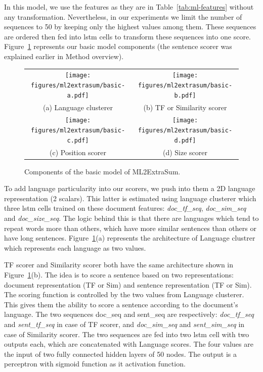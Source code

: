 In this model, we use the features as they are in Table~\ref{tab:ml-features} without any transformation. 
Nevertheless, in our experiments we limit the number of sequences to 50 by keeping only the highest values among them. 
These sequences are ordered then fed into \ac{lstm} cells to transform these sequences into one score.
Figure~\ref{fig:ml2extrasum-basic} represents our basic model components (the sentence scorer was explained earlier in Method overview).

\begin{figure}[!ht]
	\centering
	\begin{tabular}{cc}
		\texttt{[image: figures/ml2extrasum/basic-a.pdf]}
		&
		\texttt{[image: figures/ml2extrasum/basic-b.pdf]}
		\\
		(a) Language clusterer & (b) TF or Similarity scorer\\
		\texttt{[image: figures/ml2extrasum/basic-c.pdf]}
		&
		\texttt{[image: figures/ml2extrasum/basic-d.pdf]}
		\\
		(c) Position scorer & (d) Size scorer \\
	\end{tabular}
	
	\caption{Components of the basic model of ML2ExtraSum.}
	\label{fig:ml2extrasum-basic}
\end{figure}

To add language particularity into our scorers, we push into them a 2D language representation (2 scalars). 
This latter is estimated using language clusterer which three \ac{lstm} cells trained on these document features: \textit{doc\_tf\_seq}, \textit{doc\_sim\_seq} and \textit{doc\_size\_seq}.
The logic behind this is that there are languages which tend to repeat words more than others, which have more similar sentences than others or have long sentences.
Figure~\ref{fig:ml2extrasum-basic}(a) represents the architecture of Language clustrer which represents each language as two values.

TF scorer and Similarity scorer both have the same architecture shown in Figure~\ref{fig:ml2extrasum-basic}(b).
The idea is to score a sentence based on two representations: document representation (TF or Sim) and sentence representation (TF or Sim). 
The scoring function is controlled by the two values from Language clusterer. 
This gives them the ability to score a sentence according to the document's language. 
The two sequences doc\_seq and sent\_seq are respectively: \textit{doc\_tf\_seq} and \textit{sent\_tf\_seq} in case of TF scorer, and \textit{doc\_sim\_seq} and \textit{sent\_sim\_seq} in case of Similarity scorer. 
The two sequences are fed into two \ac{lstm} cell with two outputs each, which are concatenated with Language scores.
The four values are the input of two fully connected hidden layers of 50 nodes. 
The output is a perceptron with sigmoid function as it activation function. 

